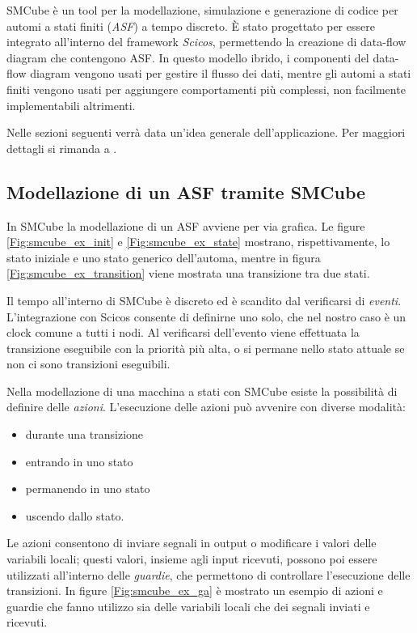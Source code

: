 SMCube\cite{smcube} è un tool per la modellazione, simulazione e generazione di codice per automi a stati finiti (\textsl{ASF}) a tempo discreto. È stato progettato per essere integrato all'interno del framework \textsl{Scicos}\cite{scicos}, permettendo la creazione di data-flow diagram che contengono ASF. In questo modello ibrido, i componenti del data-flow diagram vengono usati per gestire il flusso dei dati, mentre gli automi a stati finiti vengono usati per aggiungere comportamenti più complessi, non facilmente implementabili altrimenti.

Nelle sezioni seguenti verrà data un'idea generale dell'applicazione. Per maggiori dettagli si rimanda a \cite{smcube_man}.

\subsection{Modellazione di un ASF tramite SMCube}
In SMCube la modellazione di un ASF avviene per via grafica. Le figure \ref{Fig:smcube_ex_init} e \ref{Fig:smcube_ex_state} mostrano, rispettivamente, lo stato iniziale e uno stato generico dell'automa, mentre in figura \ref{Fig:smcube_ex_transition} viene mostrata una transizione tra due stati.

Il tempo all'interno di SMCube è discreto ed è scandito dal verificarsi di \textsl{eventi}. L'integrazione con Scicos consente di definirne uno solo, che nel nostro caso è un clock comune a tutti i nodi. Al verificarsi dell'evento viene effettuata la transizione eseguibile con la priorità più alta, o si permane nello stato attuale se non ci sono transizioni eseguibili.

Nella modellazione di una macchina a stati con SMCube esiste la possibilità di definire delle \textsl{azioni}. L'esecuzione delle azioni può avvenire con diverse modalità:

\begin{itemize}
\item durante una transizione
\item entrando in uno stato
\item permanendo in uno stato
\item uscendo dallo stato.
\end{itemize}

Le azioni consentono di inviare segnali in output o modificare i valori delle variabili locali; questi valori, insieme agli input ricevuti, possono poi essere utilizzati all'interno delle \textsl{guardie}, che permettono di controllare l'esecuzione delle transizioni. In figure \ref{Fig:smcube_ex_ga} è mostrato un esempio di azioni e guardie che fanno utilizzo sia delle variabili locali che dei segnali inviati e ricevuti.

